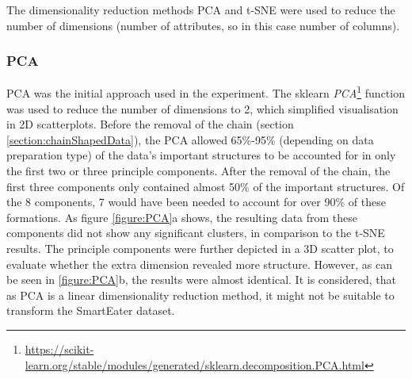
The dimensionality reduction methods PCA and t-SNE were used to reduce the number of dimensions (number of attributes, so in this case number of columns). 

\subsubsection{PCA}
PCA was the initial approach used in the experiment. The sklearn \textit{PCA}\footnote{\url{https://scikit-learn.org/stable/modules/generated/sklearn.decomposition.PCA.html}} function was used to reduce the number of dimensions to 2, which simplified visualisation in 2D scatterplots. Before the removal of the chain (section \ref{section:chainShapedData}), the PCA allowed 65\%-95\% (depending on data preparation type) of the data's important structures to be accounted for in only the first two or three principle components. After the removal of the chain, the first three components only contained almost 50\% of the important structures. Of the 8 components, 7 would have been needed to account for over 90\% of these formations. As figure \ref{figure:PCA}a shows, the resulting data from these components did not show any significant clusters, in comparison to the t-SNE results. The principle components were further depicted in a 3D scatter plot, to evaluate whether the extra dimension revealed more structure. However, as can be seen in \ref{figure:PCA}b, the results were almost identical. It is considered, that as PCA is a linear dimensionality reduction method, it might not be suitable to transform the SmartEater dataset.


